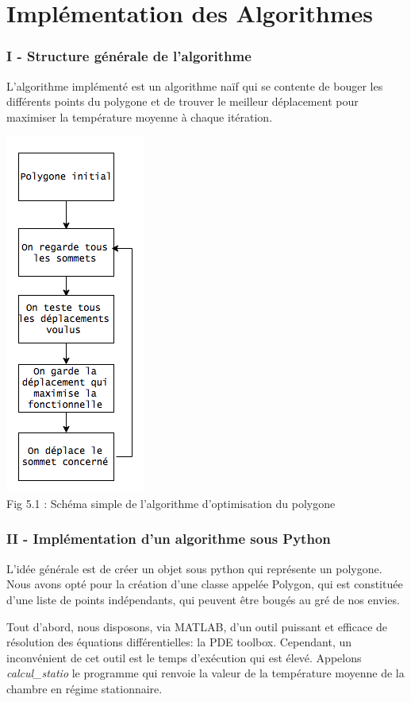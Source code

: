 \documentclass[a4paper,reqno]{article}
\newcommand{\pa}{\hspace{1cm}}
\begin{document}
\newpage
\part{Implémentation des Algorithmes}



\section*{I - Structure générale de l'algorithme}
\pa L'algorithme implémenté est un algorithme naïf qui se contente de bouger les différents points du polygone et de trouver le meilleur déplacement pour maximiser la température moyenne à chaque itération. \\

\begin{center}
	\includegraphics[scale=0.7]{algo.png}\\
	\vspace{0.2cm}
	Fig 5.1 : Schéma simple de l'algorithme d'optimisation du polygone\\
\end{center}
\vspace{0.1cm}

\section*{II - Implémentation d'un algorithme sous Python} 
\par L'idée générale est de créer un objet sous python qui représente un polygone. Nous avons opté pour la création d'une classe appelée Polygon, qui est constituée d'une liste de points indépendants, qui peuvent être bougés au gré de nos envies. 
\\
\par Tout d'abord, nous disposons, via MATLAB, d'un outil puissant et efficace de résolution des équations différentielles: la PDE toolbox. Cependant, un inconvénient de cet outil est le temps d'exécution qui est élevé. Appelons \textit{calcul\_statio} le programme qui renvoie la valeur de la température moyenne de la chambre en régime stationnaire.\\
\end{document}
